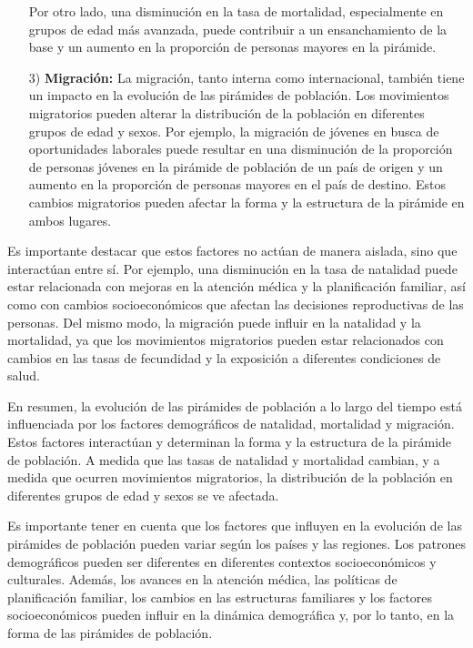 \documentclass[8pt,a4paper]{beamer}
\begin{document}
{\begin{frame}{}
\begin{block}{}
\justifying
\begin{enumerate}
\justifying
\item[{}] Por otro lado, una disminución en la tasa de mortalidad, especialmente en grupos de edad más avanzada, puede contribuir a un ensanchamiento de la base y un aumento en la proporción de personas mayores en la pirámide.
\item[3)] \textbf{Migración:} La migración, tanto interna como internacional, también tiene un impacto en la evolución de las pirámides de población. Los movimientos migratorios pueden alterar la distribución de la población en diferentes grupos de edad y sexos. Por ejemplo, la migración de jóvenes en busca de oportunidades laborales puede resultar en una disminución de la proporción de personas jóvenes en la pirámide de población de un país de origen y un aumento en la proporción de personas mayores en el país de destino. Estos cambios migratorios pueden afectar la forma y la estructura de la pirámide en ambos lugares.
\end{enumerate}
Es importante destacar que estos factores no actúan de manera aislada, sino que interactúan entre sí. Por ejemplo, una disminución en la tasa de natalidad puede estar relacionada con mejoras en la atención médica y la planificación familiar, así como con cambios socioeconómicos que afectan las decisiones reproductivas de las personas. Del mismo modo, la migración puede influir en la natalidad y la mortalidad, ya que los movimientos migratorios pueden estar relacionados con cambios en las tasas de fecundidad y la exposición a diferentes condiciones de salud.


\end{block}
\end{frame}

\begin{frame}{}
\begin{block}{}
\justifying
En resumen, la evolución de las pirámides de población a lo largo del tiempo está influenciada por los factores demográficos de natalidad, mortalidad y migración. Estos factores interactúan y determinan la forma y la estructura de la pirámide de población. A medida que las tasas de natalidad y mortalidad cambian, y a medida que ocurren movimientos migratorios, la distribución de la población en diferentes grupos de edad y sexos se ve afectada.

Es importante tener en cuenta que los factores que influyen en la evolución de las pirámides de población pueden variar según los países y las regiones. Los patrones demográficos pueden ser diferentes en diferentes contextos socioeconómicos y culturales. Además, los avances en la atención médica, las políticas de planificación familiar, los cambios en las estructuras familiares y los factores socioeconómicos pueden influir en la dinámica demográfica y, por lo tanto, en la forma de las pirámides de población.


\end{block}
\end{frame}}
\end{document}

